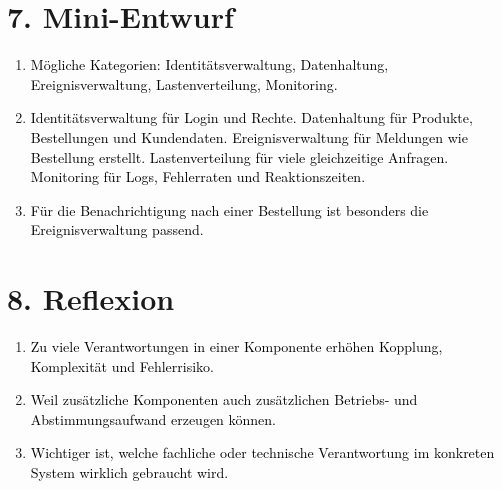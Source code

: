 \documentclass[11pt,a4paper]{article}
\newcommand{\solution}[1]{\textcolor{black}{#1}}
\begin{document}
\section*{7. Mini-Entwurf}
\begin{enumerate}
  \item \solution{Mögliche Kategorien: Identitätsverwaltung, Datenhaltung, Ereignisverwaltung, Lastenverteilung, Monitoring.}
  \item \solution{Identitätsverwaltung für Login und Rechte. Datenhaltung für Produkte, Bestellungen und Kundendaten. Ereignisverwaltung für Meldungen wie \glqq Bestellung erstellt\grqq{}. Lastenverteilung für viele gleichzeitige Anfragen. Monitoring für Logs, Fehlerraten und Reaktionszeiten.}
  \item \solution{Für die Benachrichtigung nach einer Bestellung ist besonders die Ereignisverwaltung passend.}
\end{enumerate}

\section*{8. Reflexion}
\begin{enumerate}
  \item \solution{Zu viele Verantwortungen in einer Komponente erhöhen Kopplung, Komplexität und Fehlerrisiko.}
  \item \solution{Weil zusätzliche Komponenten auch zusätzlichen Betriebs- und Abstimmungsaufwand erzeugen können.}
  \item \solution{Wichtiger ist, welche fachliche oder technische Verantwortung im konkreten System wirklich gebraucht wird.}
\end{enumerate}
\end{document}
